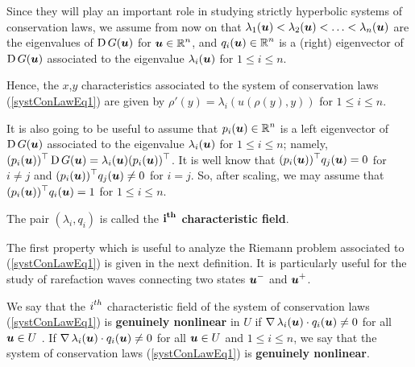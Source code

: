 Since they will play an important role in studying strictly hyperbolic
systems of conservation laws, we assume from now on that
$\lambda_1({\bm{u}}) < \lambda_2({\bm{u}}) < \ldots < \lambda_n({\bm{u}})$
are the eigenvalues of $\operatorname{D} G({\bm{u}})$ for $\displaystyle {\bm{u}} \in \mathbb{R}^n$,
and $\displaystyle q_i({\bm{u}}) \in \mathbb{R}^n$ is a (right) eigenvector of
$\operatorname{D} G({\bm{u}})$
associated to the eigenvalue $\lambda_i({\bm{u}})$ for $1 \leq i \leq n$.

Hence, the $x$,$y$ characteristics associated to the system of
conservation laws (\ref{systConLawEq1}) are given by
$\rho'(y) = \lambda_i(u(\rho(y),y))$ for $1\leq i \leq n$.

It is also going to be useful to assume that
$\displaystyle p_i({\bm{u}}) \in \mathbb{R}^n$
is a left eigenvector of $\operatorname{D} G({\bm{u}})$ associated to the
eigenvalue $\lambda_i({\bm{u}})$ for $1 \leq i \leq n$; 
namely, $\displaystyle (p_i({\bm{u}}))^\top \operatorname{D} G({\bm{u}})
= \lambda_i({\bm{u}}) (p_i({\bm{u}}))^\top$.  It is well know that
$\displaystyle (p_i({\bm{u}}))^\top q_j({\bm{u}}) = 0$ for $i \neq j$
and $\displaystyle (p_i({\bm{u}}))^\top q_j({\bm{u}}) \neq 0$ for $i=j$.
So, after scaling, we may assume that
$\displaystyle (p_i({\bm{u}}))^\top q_i({\bm{u}}) =1$
for $1\leq i \leq n$.

\begin{defn}
The pair $(\lambda_i,q_i)$ is called the
{\bfseries $\displaystyle \mathbf{i^{th}}$ characteristic
field}.
\end{defn}

The first property which is useful to analyze the Riemann problem associated to
(\ref{systConLawEq1}) is given in the next definition.  It is
particularly useful for the study of rarefaction waves connecting two
states $\displaystyle {\bm{u}}^-$ and $\displaystyle {\bm{u}}^+$.

\begin{defn}
We say that the $\displaystyle i^{th}$ characteristic field of the system
of conservation laws (\ref{systConLawEq1}) is
{\bfseries genuinely nonlinear}
in $U$ if
$\operatorname{\nabla} \lambda_i({\bm{u}}) \cdot q_i({\bm{u}}) \neq 0$
for all ${\bm{u}} \in U$ \footnotemark.
If $\operatorname{\nabla} \lambda_i({\bm{u}}) \cdot q_i({\bm{u}}) \neq 0$
for all ${\bm{u}} \in U$ and $1\leq i \leq n$, we say
that the system of conservation laws (\ref{systConLawEq1}) is
{\bfseries genuinely nonlinear}.
\end{defn}


